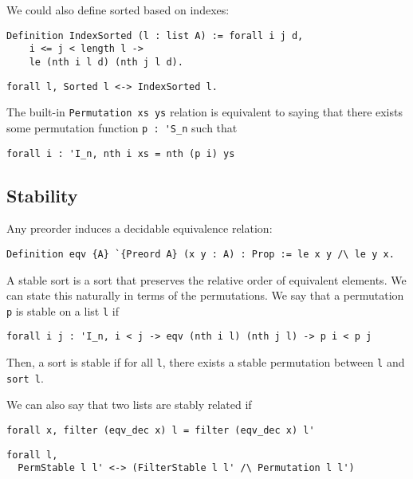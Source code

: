 \documentclass[11pt]{article}
\begin{document}
We could also define sorted based on indexes:
\begin{verbatim}
Definition IndexSorted (l : list A) := forall i j d,
    i <= j < length l ->
    le (nth i l d) (nth j l d).
\end{verbatim}

\begin{theorem}
\begin{verbatim}
forall l, Sorted l <-> IndexSorted l.
\end{verbatim}
\end{theorem}

\begin{theorem}
  The built-in \verb|Permutation xs ys| relation is equivalent to saying
  that there exists some permutation function \verb|p : 'S_n| such that
\begin{verbatim}
forall i : 'I_n, nth i xs = nth (p i) ys
\end{verbatim}
\end{theorem}

\subsection{Stability}
Any preorder induces a decidable equivalence relation:
\begin{verbatim}
Definition eqv {A} `{Preord A} (x y : A) : Prop := le x y /\ le y x.
\end{verbatim}
A stable sort is a sort that preserves the relative order of
equivalent elements. We can state this naturally in terms of the
permutations. We say that a permutation \verb|p| is stable on a list
\verb|l| if
\begin{verbatim}
forall i j : 'I_n, i < j -> eqv (nth i l) (nth j l) -> p i < p j
\end{verbatim}
Then, a sort is stable if for all \verb|l|, there exists a stable
permutation between \verb|l| and \verb|sort l|.

We can also say that two lists are stably related if
\begin{verbatim}
forall x, filter (eqv_dec x) l = filter (eqv_dec x) l'
\end{verbatim}

\begin{theorem}
\begin{verbatim}
forall l,
  PermStable l l' <-> (FilterStable l l' /\ Permutation l l')
\end{verbatim}
\end{theorem}
\end{document}
